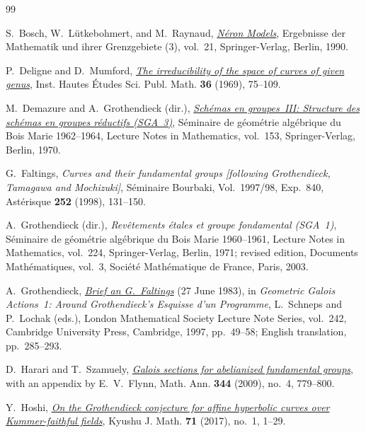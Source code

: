 \documentclass[11pt,a4paper]{article}
\numberwithin{equation}{section}
\theoremstyle{plain}
\theoremstyle{definition}
\theoremstyle{remark}
\begin{document}
\begin{thebibliography}{99}
\small
\raggedright
\hypersetup{urlcolor=black}

S.~Bosch, W.~L\"utkebohmert, and M.~Raynaud,
\href{https://doi.org/10.1007/978-3-642-51438-8}{\emph{N\'eron Models}},
Ergebnisse der Mathematik und ihrer Grenzgebiete (3), vol.~21,
Springer-Verlag, Berlin, 1990.

P.~Deligne and D.~Mumford,
\href{https://doi.org/10.1007/BF02684599}{\emph{The irreducibility of the
space of curves of given genus}},
Inst. Hautes \'Etudes Sci. Publ. Math. \textbf{36} (1969), 75--109.

M.~Demazure and A.~Grothendieck (dir.),
\href{https://doi.org/10.1007/BFb0059027}{\emph{Sch\'emas en groupes~III:
Structure des sch\'emas en groupes r\'eductifs (SGA~3)}},
S\'eminaire de g\'eom\'etrie alg\'ebrique du Bois Marie 1962--1964,
Lecture Notes in Mathematics, vol.~153,
Springer-Verlag, Berlin, 1970.

G.~Faltings, \emph{Curves and their fundamental groups
[following Grothendieck, Tamagawa and Mochizuki]},
S\'eminaire Bourbaki, Vol.~1997/98, Exp.~840,
Ast\'erisque \textbf{252} (1998), 131--150.

A.~Grothendieck (dir.),
\emph{Rev\^etements \'etales et groupe fondamental (SGA~1)},
S\'eminaire de g\'eom\'etrie alg\'ebrique du Bois Marie 1960--1961,
Lecture Notes in Mathematics, vol.~224, Springer-Verlag, Berlin, 1971;
revised edition, Documents Math\'ematiques, vol.~3,
Soci\'et\'e Math\'ematique de France, Paris, 2003.

A.~Grothendieck,
\href{https://doi.org/10.1017/CBO9780511758874.004}{\emph{Brief an
G.~Faltings}} (27 June 1983),
in \emph{Geometric Galois Actions~1: Around Grothendieck's
Esquisse d'un Programme}, L.~Schneps and P.~Lochak (eds.),
London Mathematical Society Lecture Note Series, vol.~242,
Cambridge University Press, Cambridge, 1997, pp.~49--58;
English translation, pp.~285--293.

D.~Harari and T.~Szamuely,
\href{https://doi.org/10.1007/s00208-008-0327-z}{\emph{Galois sections
for abelianized fundamental groups}},
with an appendix by E.~V.~Flynn,
Math. Ann. \textbf{344} (2009), no.~4, 779--800.

Y.~Hoshi,
\href{https://doi.org/10.2206/kyushujm.71.1}{\emph{On the Grothendieck
conjecture for affine hyperbolic curves over Kummer-faithful fields}},
Kyushu J. Math. \textbf{71} (2017), no.~1, 1--29.


\end{thebibliography}
\end{document}

